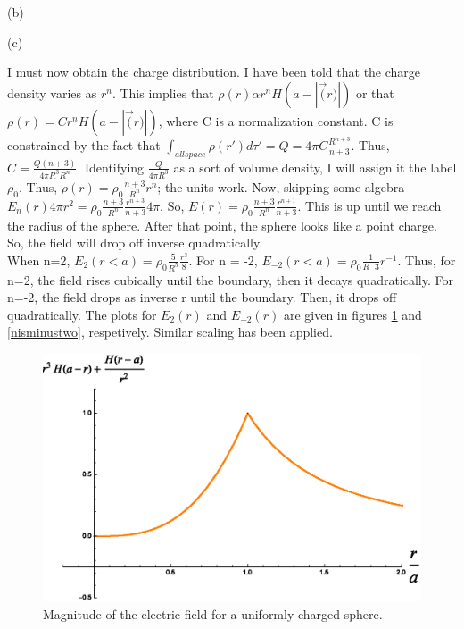 \begin{homeworkProblem}
\begin{homeworkSection}{(b)}
\end{homeworkSection}

\begin{homeworkSection}{(c)}

I must now obtain the charge distribution. I have been told that the charge density varies as $r^n$. This implies that $\rho(r) \alpha r^n H(a-|\vec(r)|)$ or that $\rho(r) = C r^n H(a-|\vec(r)|)$, where C is a normalization constant. C is constrained by the fact that $\int_{all space} \rho(r')d\tau' = Q = 4\pi C \frac{R^{n+3}}{n+3}$. Thus, $C = \frac{Q (n+3)}{4\pi R^3 R^n}$. Identifying $\frac{Q}{4\pi R^3}$ as a sort of volume density, I will assign it the label $\rho_0$. Thus, $\rho(r) = \rho_0 \frac{n+3}{R^n} r^n$; the units work. Now, skipping some algebra $E_n(r) 4\pi r^2 = \rho_0 \frac{n+3}{R^n} \frac{r^{n+3}}{n+3} 4\pi$. So, $E(r) = \rho_0 \frac{n+3}{R^n} \frac{r^{n+1}}{n+3}$. This is up until we reach the radius of the sphere. After that point, the sphere looks like a point charge. So, the field will drop off inverse quadratically.
\\
When n=2, $E_2(r<a) =  \rho_0 \frac{5}{R^5} \frac{r^{3}}{8}$. For n = -2, $E_{-2}(r<a)=\rho_0 \frac{1}{R^-3} r^{-1}$. Thus, for n=2, the field rises cubically until the boundary, then it decays quadratically. For n=-2, the field drops as inverse r until the boundary. Then, it drops off quadratically. The plots for $E_2(r)$ and $E_{-2}(r)$ are given in figures \ref{nistwo} and \ref{nisminustwo}, respetively. Similar scaling has been applied.


\begin{figure}%
\centerline{\includegraphics[width=.75\columnwidth,height=.25\paperheight]{./Images/nsphereequalstwo.eps}}%
\caption{Magnitude of the electric field for a uniformly charged sphere.}%
\label{nistwo}%
\end{figure}



\end{homeworkSection}
\end{homeworkProblem}

